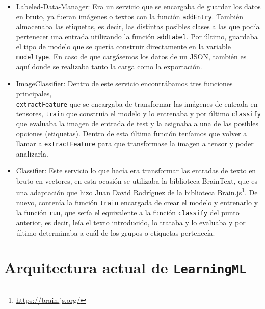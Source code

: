 \documentclass[a4paper, 12pt]{book}
\begin{document}
\begin{itemize}
 
	\item Labeled-Data-Manager: Era un servicio que se encargaba de guardar los datos en bruto, ya fueran imágenes o textos con la función \texttt{addEntry}. También almacenaba las etiquetas, es decir, las distintas posibles clases a las que podía pertenecer una entrada utilizando la función \texttt{addLabel}. Por último, guardaba el tipo de modelo que se quería construir directamente en la variable \texttt{modelType}. En caso de que cargásemos los datos de un JSON, también es aquí donde se realizaba tanto la carga como la exportación.
 
	\item ImageClassifier: Dentro de este servicio encontrábamos tres funciones principales, \\ \texttt{extractFeature} que se encargaba de transformar las imágenes de entrada en tensores, \texttt{train} que construía el modelo y lo entrenaba y por último \texttt{classify} que evaluaba la imagen de entrada de test y la asignaba a una de las posibles opciones (etiquetas). Dentro de esta última función teníamos que volver a llamar a \texttt{extractFeature} para que transformase la imagen a tensor y poder analizarla.

	\item Classifier: Este servicio lo que hacía era transformar las entradas de texto en bruto en vectores, en esta ocasión se utilizaba la biblioteca BrainText, que es una adaptación que hizo Juan David Rodríguez de la biblioteca Brain.js\footnote{\url{https://brain.js.org/}}. De nuevo, contenía la función \texttt{train} encargada de crear el modelo y entrenarlo y la función \texttt{run}, que sería el equivalente a la función \texttt{classify} del punto anterior, es decir, leía el texto introducido, lo trataba y lo evaluaba y por último determinaba a cuál de los grupos o etiquetas pertenecía.

\end{itemize}

\section{Arquitectura actual de \texttt{LearningML}} 
\label{sec:arquitecturaactual}
\end{document}
